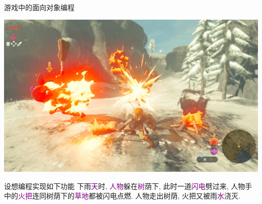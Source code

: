 \documentclass{beamer}
\newcommand{\purple}{\textcolor{purple}}
\begin{document}
    \begin{frame}{游戏中的面向对象编程}
      \begin{center}
        \begin{tcolorbox}[beamer,width=0.8\textwidth,arc=0pt,boxsep=0pt,left=0pt,right=0pt,top=0pt,bottom=0pt]
          \includegraphics[width=\textwidth]{figure/zad.png}
        \end{tcolorbox}
      \end{center}
      \begin{block}{\small 设想编程实现如下功能}\small
        下雨\purple{天}时, \purple{人物}躲在\purple{树}荫下, 此时一道\purple{闪电}劈过来, 人物手中的\purple{火把}连同树荫下的\purple{草地}都被闪电点燃. 人物走出树荫, 火把又被雨\purple{水}浇灭.
      \end{block}
    \end{frame}
\end{document}
